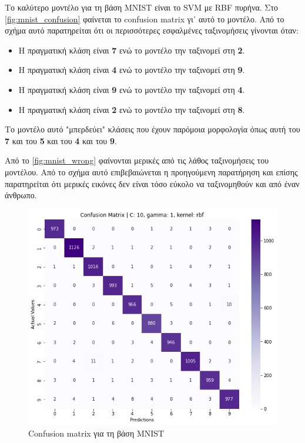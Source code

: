\documentclass[a4paper]{article}
\begin{document}
Το καλύτερο μοντέλο για τη βάση MNIST είναι το SVM με RBF πυρήνα. Στο
\autoref{fig:mnist_confusion} φαίνεται το confusion matrix γι᾽ αυτό το μοντέλο.
Από το σχήμα αυτό παρατηρείται ότι οι περισσότερες εσφαλμένες ταξινομήσεις
γίνονται όταν:

\begin{itemize}
    \item Η πραγματική κλάση είναι {\bf7} ενώ το μοντέλο την ταξινομεί στη
        {\bf2}.
    \item Η πραγματική κλάση είναι {\bf4} ενώ το μοντέλο την ταξινομεί στη
        {\bf9}.
    \item Η πραγματική κλάση είναι {\bf9} ενώ το μοντέλο την ταξινομεί στη
        {\bf4}.
    \item Η πραγματική κλάση είναι {\bf2} ενώ το μοντέλο την ταξινομεί στη
        {\bf8}.
\end{itemize}

Το μοντέλο αυτό "μπερδεύει" κλάσεις που έχουν παρόμοια μορφολογία όπως αυτή του
{\bf7} και του {\bf5} και του {\bf4} και του {\bf9}.

Από το \autoref{fig:mnist_wrong} φαίνονται μερικές από τις λάθος ταξινομήσεις
του μοντέλου. Από το σχήμα αυτό επιβεβαιώνεται η προηγούμενη παρατήρηση και
επίσης παρατηρείται ότι μερικές εικόνες δεν είναι τόσο εύκολο να ταξινομηθούν
και από έναν άνθρωπο.

\begin{figure}[H]
    \centering
    \includegraphics[width=0.6\linewidth]{figures/mnist/confusion_matrix.png}
    \caption{Confusion matrix για τη βάση MNIST}
    \label{fig:mnist_confusion}
\end{figure}
\end{document}
